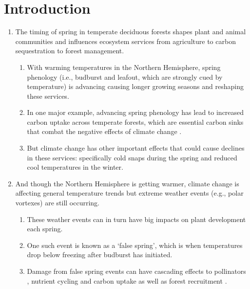 \documentclass{article}\usepackage[]{graphicx}\usepackage[]{color}
\begin{document}
\section*{Introduction}
\begin{enumerate}
\item The timing of spring in temperate deciduous forests shapes plant and animal communities and influences ecosystem services from agriculture to carbon sequestration to forest management. 
  \begin{enumerate} 
  \item With warming temperatures in the Northern Hemisphere, spring phenology (i.e., budburst and leafout, which  are strongly cued by temperature) is advancing causing longer growing seasons \citep{Chuine2001} and reshaping these services.  
  \item In one major example, advancing spring phenology has lead to increased carbon uptake across temperate forests, which are essential carbon sinks that combat the negative effects of climate change \citep{Keenan2014}.
  \item But climate change has other important effects that could cause declines in these services: specifically cold snaps during the spring and reduced cool temperatures in the winter. 
  \end{enumerate}
  
\item And though the Northern Hemisphere is getting warmer, climate change is affecting general temperature trends but extreme weather events (e.g., polar vortexes) are still occurring. 
  \begin{enumerate}
  \item These weather events can in turn have big impacts on plant development each spring. 
  \item One such event is known as a `false spring', which is when temperatures drop below freezing \citep[][i.e., below -2.2$^{\circ}$C]{Schwartz2002} after budburst has initiated.
  \item Damage from false spring events can have cascading effects to pollinators \citep{Boggs2012, Pardee2017}, nutrient cycling and carbon uptake as well as forest recruitment \citep{Hufkens2012, Klosterman2018, Richardson2013}.
  \end{enumerate}


\end{enumerate}
\end{document}
